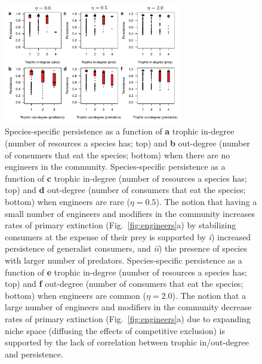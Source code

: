 \documentclass[twocolumn,preprintnumbers,amsmath,amssymb,superscriptaddress,linenumbers]{revtex4-1}
\begin{document}
\begin{figure}[h!]
\centering
\includegraphics[width=0.7\textwidth]{fig_indeng_combined.pdf}
\caption{
Species-specific persistence as a function of \textbf{a} trophic in-degree (number of resources a species has; top) and \textbf{b} out-degree (number of consumers that eat the species; bottom) when there are no engineers in the community. 
Species-specific persistence as a function of \textbf{c} trophic in-degree (number of resources a species has; top) and \textbf{d} out-degree (number of consumers that eat the species; bottom) when engineers are rare ($\eta = 0.5$).
The notion that having a small number of engineers and modifiers in the community increases rates of primary extinction (Fig.\ \ref{fig:engineers}a) by stabilizing consumers at the expense of their prey is supported by \emph{i}) increased persistence of generalist consumers, and \emph{ii}) the presence of species with larger number of predators.
Species-specific persistence as a function of \textbf{e} trophic in-degree (number of resources a species has; top) and \textbf{f} out-degree (number of consumers that eat the species; bottom) when engineers are common ($\eta = 2.0$).
The notion that a large number of engineers and modifiers in the community decrease rates of primary extinction (Fig.\ \ref{fig:engineers}a) due to expanding niche space (diffusing the effects of competitive exclusion) is supported by the lack of correlation between trophic in/out-degree and persistence.
}
\label{fig:indeng}
\end{figure}
\end{document}
